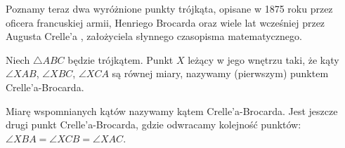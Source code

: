 %

Poznamy teraz dwa wyróżnione punkty trójkąta, opisane w 1875 roku przez oficera francuskiej armii, Henriego Brocarda oraz wiele lat wcześniej przez Augusta Crelle'a \cite{crelle_1816}, założyciela słynnego czasopisma matematycznego.
%
%

\begin{definition}
    Niech $\triangle ABC$ będzie trójkątem.
    Punkt $X$ leżący w jego wnętrzu taki, że kąty $\angle XAB$, $\angle XBC$, $\angle XCA$ są równej miary, nazywamy (pierwszym) punktem Crelle'a-Brocarda.
    \begin{center}
\begin{comment}
    \begin{tikzpicture}[scale=.75]
        \tkzInit[xmin=-0.5,xmax=6.5, ymin=-0.5,ymax=4.5]
        \tkzClip
        \tkzDefPoint(0, 0){A}
        \tkzDefPoint(6, 1){B}
        \tkzDefPoint(1.5, 4){C}
        \tkzLabelPoint[below left](A){$A$}
        \tkzLabelPoint[right](B){$B$}
        \tkzLabelPoint[above](C){$C$}

        \tkzDefLine[mediator](A,B) \tkzGetPoints{AB1}{AB2}
        \tkzDefLine[orthogonal=through B](B,C) \tkzGetPoint{BC3}
        \tkzInterLL(AB1,AB2)(B,BC3) \tkzGetPoint{S1}
        \tkzDefLine[mediator](B,C) \tkzGetPoints{BC1}{BC2}
        \tkzDefLine[orthogonal=through C](A,C) \tkzGetPoint{AC3}
        \tkzInterLL(BC1,BC2)(C,AC3) \tkzGetPoint{S2}
        \tkzInterCC(S1,B)(S2,C) \tkzGetPoints{Bro1}{Bro2} %
        \tkzLabelPoint[above right](Bro1){$X$}
        \tkzDrawSegments[line width=0.2mm](A,Bro1 B,Bro1 C,Bro1)
        \tkzFillAngle[fill=black!30,size=1](B,A,Bro1)
        \tkzFillAngle[fill=black!30,size=1](C,B,Bro1)
        \tkzFillAngle[fill=black!30,size=1](A,C,Bro1)
        \tkzDrawPolygon[line width=0.4mm](A,B,C)
        \tkzDrawPoints[size=3,color=black,fill=black!50](Bro1)
    \end{tikzpicture}
\end{comment}
    \end{center}
\end{definition}

Miarę wspomnianych kątów nazywamy kątem Crelle'a-Brocarda.
%
Jest jeszcze drugi punkt Crelle'a-Brocarda, gdzie odwracamy kolejność punktów: $\angle XBA = \angle XCB = \angle XAC$.

